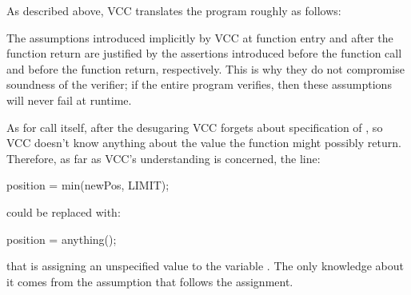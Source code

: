As described above, VCC translates the program roughly as follows:

\begin{note}
The assumptions introduced implicitly by VCC at function entry and
after the function return are justified by the assertions
introduced before the function call and before the function return, respectively.
This is why they do not compromise soundness of the verifier;
\ie if the entire program verifies, then 
these assumptions will never fail at runtime.
\end{note}

As for call itself, after the desugaring VCC forgets about
specification of , so VCC doesn't know
anything about the value the function
might possibly return.  Therefore, as far as VCC's understanding is
concerned, the line:
\begin{VCC}
position = min(newPos, LIMIT);
\end{VCC}
\noindent
{}
could be replaced with:
\begin{VCC}
position = anything();
\end{VCC}
\noindent
that is assigning an unspecified value to the variable .
The only knowledge about it comes from the assumption that follows the assignment.

